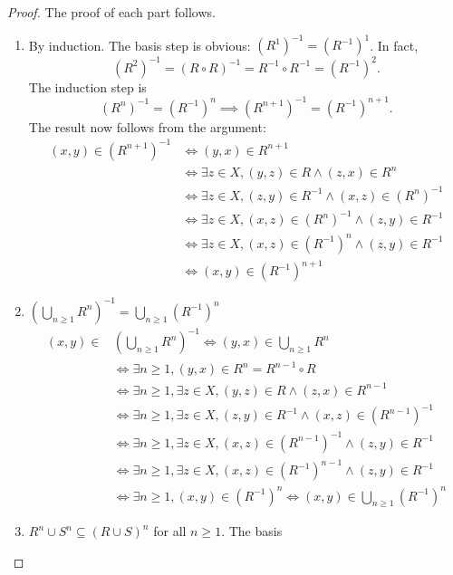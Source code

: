 \documentclass[
  letterpaper,
  10pt,
  reqno,
  twopage,
  openany]{book}
\theoremstyle{plain}
\theoremstyle{definition}
\theoremstyle{definition}
\theoremstyle{definition}
\theoremstyle{plain}
\theoremstyle{plain}
\theoremstyle{remark}
\begin{document}
\begin{proof}

The proof of each part follows.

\begin{enumerate}
\def\labelenumi{(\arabic{enumi})}
\item
  By induction. The basis step is obvious: \((R^{1})^{-1}=(R^{-1})^1\).
  In fact, \[
  (R^2)^{-1} = (R\circ R)^{-1} = R^{-1}\circ R^{-1} = (R^{-1})^2.
  \] The induction step is \[
  (R^n)^{-1}=(R^{-1})^n\implies (R^{n+1})^{-1}=(R^{-1})^{n+1}.
  \] The result now follows from the argument: \begin{align*}
  (x,y)\in (R^{n+1})^{-1} 
  & \Longleftrightarrow (y,x)\in R^{n+1} \\
  & \Longleftrightarrow \exists z\in X, (y,z)\in R \land (z,x)\in R^n \\
  & \Longleftrightarrow \exists z\in X, (z,y)\in R^{-1} \land (x,z)\in (R^n)^{-1}\\
  & \Longleftrightarrow \exists z\in X, (x,z)\in (R^n)^{-1} \land (z,y)\in R^{-1}\\
  & \Longleftrightarrow \exists z\in X, (x,z)\in (R^{-1})^n \land (z,y)\in R^{-1} \\
  & \Longleftrightarrow (x,y)\in (R^{-1})^{n+1}
  \end{align*}
\item
  \(\left( \bigcup_{n\geq 1} R^n \right)^{-1} = \bigcup_{n\geq 1} (R^{-1})^{n}\)
  \begin{align*}
  (x,y)\in & \left( \bigcup_{n\geq 1} R^n \right)^{-1} 
  \Longleftrightarrow (y,x)\in \bigcup_{n\geq 1} R^n \\
  & \Longleftrightarrow \exists n\geq 1, (y,x)\in R^n =R^{n-1}\circ R \\
  & \Longleftrightarrow \exists n\geq 1, \exists z\in X, (y,z)\in R \land (z,x)\in R^{n-1} \\
  & \Longleftrightarrow \exists n\geq 1, \exists z\in X, (z,y)\in R^{-1} \land (x,z)\in (R^{n-1})^{-1}\\
  & \Longleftrightarrow \exists n\geq 1, \exists z\in X, (x,z)\in (R^{n-1})^{-1} \land (z,y)\in R^{-1}  \\
  & \Longleftrightarrow \exists n\geq 1, \exists z\in X, (x,z)\in (R^{-1})^{n-1} \land (z,y)\in R^{-1} \\ 
  & \Longleftrightarrow \exists n\geq 1, (x,y)\in (R^{-1})^n \Longleftrightarrow (x,y)\in \bigcup_{n\geq 1}(R^{-1})^n
  \end{align*}
\item
  \(R^n \cup S^n\subseteq (R\cup S)^n\) for all \(n\geq 1.\) The basis

\end{enumerate}
\end{proof}
\end{document}

